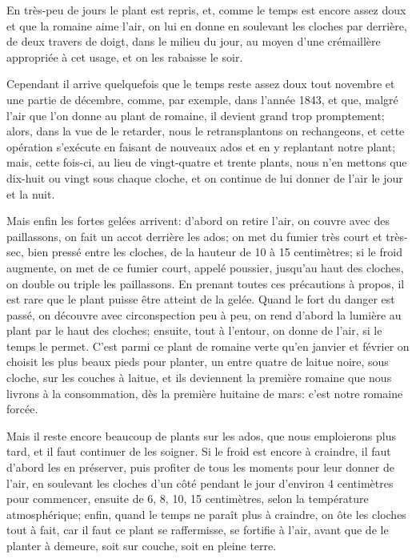 \documentclass[10pt,a4paper]{book}
\begin{document}
En très-peu de jours le plant est repris, et, comme le temps est encore assez doux et que la romaine aime l'air, on lui en donne en soulevant les cloches par derrière, de deux travers de doigt, dans le milieu du jour, au moyen d'une crémaillère appropriée à cet usage, et on les rabaisse le soir.

Cependant il arrive quelquefois que le temps reste assez doux tout novembre et une partie de décembre, comme, par exemple, dans l'année 1843, et que, malgré l'air que l'on donne au plant de romaine, il devient grand trop promptement; alors, dans la vue de le retarder, nous le retransplantons on rechangeons, et cette opération s'exécute en faisant de nouveaux ados et en y replantant notre plant; mais, cette fois-ci, au lieu de vingt-quatre et trente plants, nous n'en mettons que dix-huit ou vingt sous chaque cloche, et on continue de lui donner de l'air le jour et la nuit.

Mais enfin les fortes gelées arrivent: d'abord on retire l'air, on couvre avec des paillassons, on fait un accot derrière les ados; on met du fumier très court et très-sec, bien pressé entre les cloches, de la hauteur de 10 à 15 centimètres; si le froid augmente, on met de ce fumier court, appelé poussier, jusqu'au haut des cloches, on double ou triple les paillassons. En prenant toutes ces précautions à propos, il est rare que le plant puisse être atteint de la gelée. Quand le fort du danger est passé, on découvre avec circonspection peu à peu, on rend d'abord la lumière au plant par le haut des cloches; ensuite, tout à l'entour, on donne de l'air, si le temps le permet. C'est parmi ce plant de romaine verte qu'en janvier et février on choisit les plus beaux pieds pour planter, un entre quatre de laitue noire, sous cloche, sur les couches à laitue, et ils deviennent la première romaine que nous livrons à la consommation, dès la première huitaine de mars: c'est notre romaine forcée.

Mais il reste encore beaucoup de plants sur les ados, que nous emploierons plus tard, et il faut continuer de les soigner. Si le froid est encore à craindre, il faut d'abord les en préserver, puis profiter de tous les moments pour leur donner de l'air, en soulevant les cloches d'un côté pendant le jour d'environ 4 centimètres pour commencer, ensuite de 6, 8, 10, 15 centimètres, selon la température atmosphérique; enfin, quand le temps ne paraît plus à craindre, on ôte les cloches tout à fait, car il faut ce plant se raffermisse, se fortifie à l'air, avant que de le planter à demeure, soit sur couche, soit en pleine terre.
\end{document}

